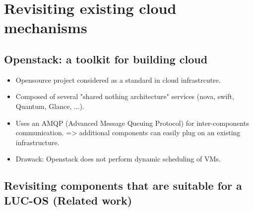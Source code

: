 \section{Revisiting existing cloud mechanisms}
\label{sec:integration}

\subsection{Openstack: a toolkit for building cloud}

\begin{itemize}
	
	\item Opensource project considered as a standard in cloud infrastrcutre.

	\item Composed of several "shared nothing architecture" services (nova, 
	swift, Quantum, Glance, ...).

	\item Uses an AMQP (Advanced Message Queuing Protocol) for inter-components 
	communication. => additional components can easily plug on an existing
	infrastructure.

	\item Drawack: Openstack does not perform dynamic scheduling of VMs.

\end{itemize}


\subsection{Revisiting components that are suitable for a LUC-OS (Related work)}

